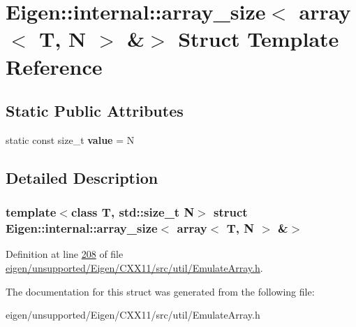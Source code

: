 \hypertarget{struct_eigen_1_1internal_1_1array__size_3_01array_3_01_t_00_01_n_01_4_01_6_4}{}\section{Eigen\+:\+:internal\+:\+:array\+\_\+size$<$ array$<$ T, N $>$ \&$>$ Struct Template Reference}
\label{struct_eigen_1_1internal_1_1array__size_3_01array_3_01_t_00_01_n_01_4_01_6_4}
\subsection*{Static Public Attributes}
\begin{DoxyCompactItemize}
\item 
\mbox{\label{struct_eigen_1_1internal_1_1array__size_3_01array_3_01_t_00_01_n_01_4_01_6_4_a03868b9d28acfa165f2960fd669ab2d0}} 
static const size\+\_\+t {\bfseries value} = N
\end{DoxyCompactItemize}


\subsection{Detailed Description}
\subsubsection*{template$<$class T, std\+::size\+\_\+t N$>$\newline
struct Eigen\+::internal\+::array\+\_\+size$<$ array$<$ T, N $>$ \&$>$}



Definition at line \hyperlink{eigen_2unsupported_2_eigen_2_c_x_x11_2src_2util_2_emulate_array_8h_source_l00208}{208} of file \hyperlink{eigen_2unsupported_2_eigen_2_c_x_x11_2src_2util_2_emulate_array_8h_source}{eigen/unsupported/\+Eigen/\+C\+X\+X11/src/util/\+Emulate\+Array.\+h}.



The documentation for this struct was generated from the following file\+:\begin{DoxyCompactItemize}
\item 
eigen/unsupported/\+Eigen/\+C\+X\+X11/src/util/\+Emulate\+Array.\+h\end{DoxyCompactItemize}
